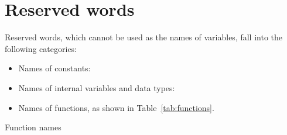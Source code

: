 \chapter{Reserved words}
\label{reswords}

Reserved words, which cannot be used as the names of variables, fall
into the following categories:

\begin{itemize}
\item Names of constants:
  

\item Names of internal variables and data types:
  

\item Names of functions, as shown in Table~\ref{tab:functions}.
\end{itemize}

\begin{table}[htbp]
\caption{Function names}
\label{tab:functions}
\begin{center}

\end{center}
\end{table}


